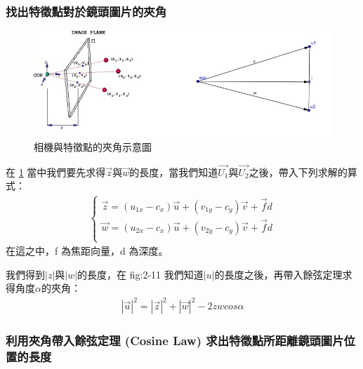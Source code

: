 	\subsubsection{找出特徵點對於鏡頭圖片的夾角}
	
	\begin{figure}
	\begin{center}
	  \includegraphics[width=1.0\textwidth]{figures/Included_Angle.jpg}
	  \caption{相機與特徵點的夾角示意圖}
	  \label{fig:Included Angle}
	\end{center}
	\end{figure}
	
	在 \ref{fig:Included Angle} 當中我們要先求得$\vec{z}$與$\vec{w}$的長度，當我們知道$\vec{U_1}$與$\vec{U_2}$之後，帶入下列求解的算式：
	\begin{align}
		\left\{
		\begin{array}{cccc}
		\vec{z} = (u_{1x} - c_x)\vec{u} + (v_{1y} - c_y)\vec{v} + \vec{f}d\\
		\vec{w} = (u_{2x} - c_x)\vec{u} + (v_{2y} - c_y)\vec{v} + \vec{f}d\\
		\end{array}
		\right.
	\end{align}
	在這之中，f 為焦距向量，d 為深度。	
	
	我們得到$|z|$與$|w|$的長度，在 fig:2-11 我們知道$|u|$的長度之後，再帶入餘弦定理求得角度$\alpha$的夾角：
	\begin{align}
		|\vec{u}|^2 = |\vec{z}|^2 + |\vec{w}|^2 - 2zwcos\alpha
	\end{align}	
	
	\subsubsection{利用夾角帶入餘弦定理 (Cosine Law) 求出特徵點所距離鏡頭圖片位置的長度}
	
